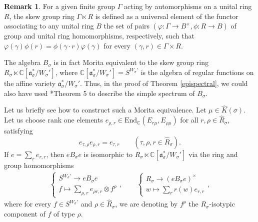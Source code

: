 \documentclass{amsart}
\theoremstyle{definition}
\newtheorem{remark}[theorem]{Remark}
\begin{document}
\begin{remark}\label{morita_equivalence}
    For a given finite group $\Gamma$ acting by automorphisms on a unital ring $R$, the skew group ring $\Gamma \ltimes R$ is defined as a universal element of the functor associating to any unital ring $B$ the set of pairs $(\varphi : \Gamma \to B^\times, \phi : R \to B)$ of group and unital ring homomorphisms, respectively, such that $\varphi(\gamma)\phi(r) = \phi(\gamma \cdot r)\varphi(\gamma)$ for every $(\gamma, r) \in \Gamma \times R$.


    The algebra $B_\sigma$ is in fact Morita equivalent to the skew group ring $R_\sigma \ltimes \mathbb{C}[\mathfrak{a}^*_\sigma/W_\sigma']$, where $\mathbb{C}[\mathfrak{a}^*_\sigma/W_\sigma'] = S^{W_\sigma'}$ is the algebra of regular functions on the affine variety $\mathfrak{a}^*_\sigma/W_\sigma'$. Thus, in the proof of Theorem \ref{epispectral}, we could also have used \cite{GaudillotEstrada}*{Theorem 5} to describe the simple spectrum of $B_\sigma$.

    Let us briefly see how to construct such a Morita equivalence. Let $\mu \in \widehat{K}(\sigma)$. Let us choose rank one elements $e_{\rho,r} \in \mathrm{End}_\mathbb{C}(E_{r\mu}, E_{\rho \mu})$ for all $r,\rho \in \hat{R}_\sigma$, satisfying
    \[e_{\tau,\rho} e_{\rho,r} = e_{\tau,r} \qquad (\tau, \rho,r \in \hat{R}_\sigma).\]
    If $e = \sum_r e_{r,r}$, then $e B_\sigma e$ is isomorphic to $R_\sigma \ltimes \mathbb{C}[\mathfrak{a}^*_\sigma/W_\sigma']$ via the ring and group homomorphisms
    \begin{gather*}
    \begin{cases}
        S^{W_\sigma'} \to e B_\sigma e\\
        f \mapsto \textstyle\sum_{\rho,r} e_{\rho r, r} \otimes f^\rho
    \end{cases},\qquad
    \begin{cases}
        R_\sigma \to (e B_\sigma e)^\times\\ w\mapsto \textstyle\sum_r r(w)e_{r,r}
    \end{cases},
    \end{gather*}
    where for every $f \in S^{W_\sigma'}$ and $\rho \in \hat{R}_\sigma$, we are denoting by $f^\rho$ the $R_\sigma$-isotypic component of $f$ of type $\rho$.
\end{remark}
\end{document}
